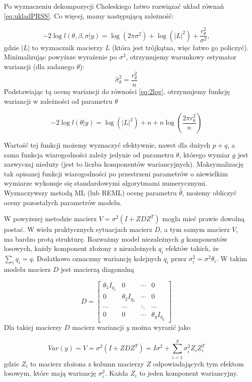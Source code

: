 \documentclass[12pt]{mwbk}
\theoremstyle{plain}
\theoremstyle{definition}
\theoremstyle{definition}
\begin{document}
Po wyznaczeniu dekompozycji Choleskiego łatwo rozwiązać układ równań \ref{eq:ukladPRSS}. Co więcej, mamy następującą zależność:

\begin{equation} \label{eq:2log}
-2\log l(\theta,\beta,\sigma|y)=\log(2\pi \sigma^2)+\log(|L|^2) +\frac{r^2_{\theta}}{\sigma^2}, 
\end{equation}
gdzie $|L|$ to wyznacznik macierzy $L$ (która jest trójkątna, więc łatwo go policzyć). Minimalizując powyższe wyrażenie po $\sigma^2$, otrzymujemy warunkowy estymator wariancji (dla zadanego $\theta$):
$$\hat{\sigma}_{\theta}^2=\frac{r^2_{\theta}}{n}$$
Podstawiając tą ocenę wariancji do równości \ref{eq:2log}, otrzymujemy funkcję wariancji w zależności od parametru $\theta$

$$-2 \log l(\theta|y)=\log(|L|^2)+n+n\log\left(\frac{2\pi r^2_{\theta}}{n}\right)$$

Wartość tej funkcji możemy wyznaczyć efektywnie, nawet dla dużych $p+q$, a sama funkcja wiarogodności zależy jedynie od parametru $\theta$, którego wymiar $g$ jest zazwyczaj nieduży (jest to liczba komponentów wariancyjnych). Maksymalizację tak opisanej funkcji wiarogodności po przestrzeni parametrów o niewielkim wymiarze wykonuje się standardowymi algorytmami numerycznymi.
Wyznaczywszy metodą ML (lub REML) ocenę parametru $\hat{\theta}$, możemy obliczyć oceny pozostałych parametrów modelu. 

W powyższej metodzie macierz $V=\sigma^2(I+ZDZ^T)$ mogła mieć prawie dowolną postać. W wielu praktycznych sytuacjach macierz $D$, a tym samym macierz $V$, ma bardzo protą strukturę.
Rozważmy model niezależnych $g$ komponentów losowych, każdy komponent złożony z niezależnych $q_i$ efektów takich, że $\sum\limits_i q_i=q$. Dodatkowo oznaczmy wariancję kolejnych $q_i$ przez $\sigma^2_i=\sigma^2\theta_i$. W takim modelu macierz $D$ jest macierzą diagonalną

$$D=\begin{bmatrix}
\theta_1I_{q_1} & 0 & \cdots & 0 \\
0 & \theta_2I_{q_2} & \cdots & 0 \\
\cdots & \cdots & \ddots & \cdots \\
0 & 0 & \cdots & \theta_gI_{q_g}
\end{bmatrix}$$
Dla takiej macierzy $D$ macierz wariancji $y$ można wyrazić jako

$$Var(y)=V=\sigma^2(I+ZDZ^T)=I\sigma^2+\sum_{i=1}^{g}\sigma_i^2Z_iZ_i^T$$
gdzie $Z_i$ to macierz złożona z kolumn macierzy $Z$ odpowiadających tym efektom losowym, które mają wariancję $\sigma^2_i$. Każda $Z_i$ to jeden komponent wariancyjny.
\end{document}
